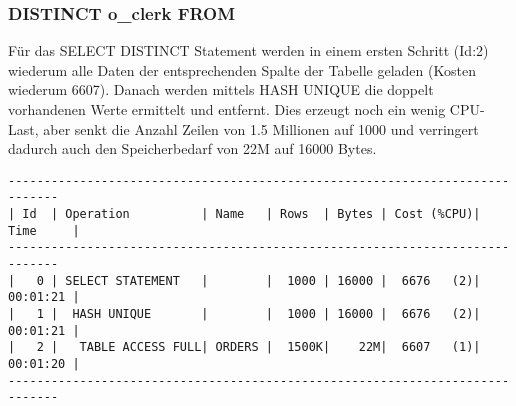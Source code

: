 \documentclass[11pt,a4paper,parskip=half]{scrartcl}
\begin{document}
\subsubsection{DISTINCT o\_clerk FROM}
\label{no-idx-pro-singlecol-distinct}
Für das SELECT DISTINCT Statement werden in einem ersten Schritt (Id:2) wiederum alle Daten der entsprechenden Spalte der Tabelle geladen (Kosten wiederum 6607). Danach werden mittels HASH UNIQUE die doppelt vorhandenen Werte ermittelt und entfernt. Dies erzeugt noch ein wenig CPU-Last, aber senkt die Anzahl Zeilen von 1.5 Millionen auf 1000 und verringert dadurch auch den Speicherbedarf von 22M auf 16000 Bytes.
\begin{lstlisting}
-----------------------------------------------------------------------------                                                                                                                                                                                                                                
| Id  | Operation          | Name   | Rows  | Bytes | Cost (%CPU)| Time     |                                                                                                                                                                                                                                
-----------------------------------------------------------------------------                                                                                                                                                                                                                                
|   0 | SELECT STATEMENT   |        |  1000 | 16000 |  6676   (2)| 00:01:21 |                                                                                                                                                                                                                                
|   1 |  HASH UNIQUE       |        |  1000 | 16000 |  6676   (2)| 00:01:21 |                                                                                                                                                                                                                                
|   2 |   TABLE ACCESS FULL| ORDERS |  1500K|    22M|  6607   (1)| 00:01:20 |                                                                                                                                                                                                                                
----------------------------------------------------------------------------- 
\end{lstlisting}
\end{document}

